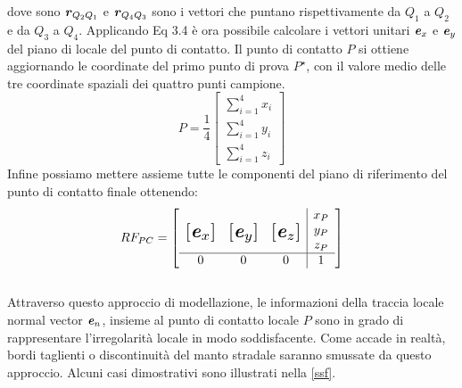 %
dove sono $\textbf{\textit{r}}_{Q_2 Q_1}$ e $\textbf{\textit{r}}_{Q_4 Q_3}$ sono i vettori che puntano rispettivamente da $Q_1$ a $Q_2$ e da $Q_3$ a $Q_4$. Applicando Eq 3.4 è ora possibile calcolare i vettori unitari $\textbf{\textit{e}}_{x}$ e $\textbf{\textit{e}}_{y}$ del piano di locale del punto di contatto. Il punto di contatto $P$ si ottiene aggiornando le coordinate del primo punto di prova $P^\star$, con il valore medio delle tre coordinate spaziali dei quattro punti campione.
%
\begin{equation}
P = \frac{1}{4}\begin{bmatrix}
\sum_{i=1}^{4} x_i \\
\sum_{i=1}^{4} y_i \\
\sum_{i=1}^{4} z_i
\end{bmatrix}
\end{equation}
%
Infine possiamo mettere assieme tutte le componenti del piano di riferimento del punto di contatto finale ottenendo:
%
\begin{equation}
RF_{PC} = \left[
\begin{array}{ccc|c}
& & & x_P\\
\multirow{3}{*}{\raisebox{20mm}{\scalebox{1.5}{$\left[\textbf{\textit{e}}_x\right]$}}} & \multirow{3}{*}{\raisebox{20mm}{\scalebox{1.5}{$\left[\textbf{\textit{e}}_y\right]$}}} & \multirow{3}{*}{\raisebox{20mm}{\scalebox{1.5}{$\left[\textbf{\textit{e}}_z\right]$}}} & y_P\\
& & & z_P\\ \hline
0 & 0 & 0 & 1
\end{array}\right]
\end{equation}\\
Attraverso questo approccio di modellazione, le informazioni della traccia locale normal vector $\textbf{\textit{e}}_{n}$, insieme al punto di contatto locale $P$ sono in grado di rappresentare l'irregolarità locale in modo soddisfacente. Come accade in realtà, bordi taglienti o discontinuità del manto stradale saranno smussate da questo approccio. Alcuni casi dimostrativi sono illustrati nella \figurename\ref{ssf}.
